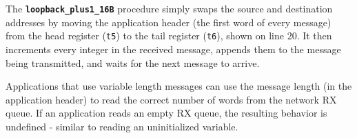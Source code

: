 The \textbf{\texttt{loopback\_plus1\_16B}} procedure simply swaps the source and destination addresses by moving the application header (the first word of every message) from the head register (\texttt{t5}) to the tail register (\texttt{t6}), shown on line 20. It then increments every integer in the received message, appends them to the message being transmitted, and waits for the next message to arrive.

Applications that use variable length messages can use the message length (in the application header) to read the correct number of words from the network RX queue. If an application reads an empty RX queue, the resulting behavior is undefined - similar to reading an uninitialized variable.